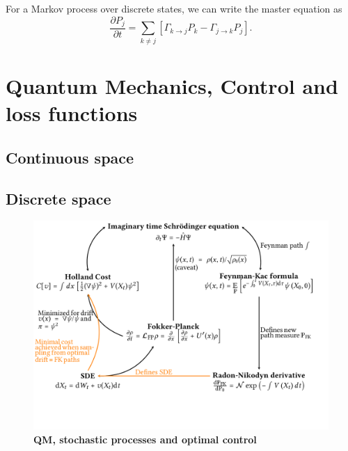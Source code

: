 For a Markov process over discrete states, we can write the master equation as 
\begin{equation}
	\frac{\partial P_{j}}{\partial t}=\sum_{k \neq j}\left[\Gamma_{k \rightarrow j} P_{k}-\Gamma_{j \rightarrow k} P_{j}\right].
\end{equation}


\newpage
\section{Quantum Mechanics, Control and loss functions}

\subsection{Continuous space}

\subsection{Discrete space}

\begin{figure}
	\centering
	\includegraphics[angle=90, width=\linewidth]{Diagrams/bp/bp-c5.pdf}
	\caption[QM, stochastic processes and optimal control]{\textbf{QM, stochastic processes and optimal control}}
	\label{fig:bp-c5}
\end{figure}






